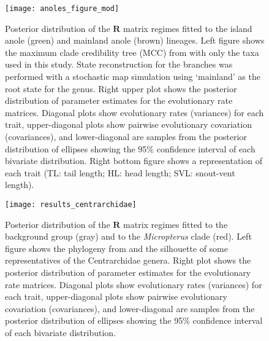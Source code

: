 \begin{figure}[h]
	\centering
	\texttt{[image: anoles\_figure\_mod]}
	\caption[Posterior distribution of the $\mathbf{R}$ matrix regimes fitted to the island anole and mainland anole lineages.]{Posterior distribution of the $\mathbf{R}$ matrix regimes fitted to the island anole (green) and mainland anole (brown) lineages. Left figure shows the maximum clade credibility tree (MCC) from \citet{gamble_anolis_2014} with only the taxa used in this study. State reconstruction for the branches was performed with a stochastic map simulation using `mainland' as the root state for the genus. Right upper plot shows the posterior distribution of parameter estimates for the evolutionary rate matrices. Diagonal plots show evolutionary rates (variances) for each trait, upper-diagonal plots show pairwise evolutionary covariation (covariances), and lower-diagonal are samples from the posterior distribution of ellipses showing the 95\% confidence interval of each bivariate distribution. Right bottom figure shows a representation of each trait (TL: tail length; HL: head length; SVL: snout-vent length).}
	\label{fig:anoles}
\end{figure}

\begin{figure}[h]
	\centering
	\texttt{[image: results\_centrarchidae]}
	\caption[Posterior distribution of the $\mathbf{R}$ matrix regimes fitted to the background group and to the \textit{Micropterus} clade.]{Posterior distribution of the $\mathbf{R}$ matrix regimes fitted to the background group (gray) and to the \textit{Micropterus} clade (red). Left figure shows the phylogeny from \citep{revell_phylogenetic_2009} and the silhouette of some representatives of the Centrarchidae genera. Right plot shows the posterior distribution of parameter estimates for the evolutionary rate matrices. Diagonal plots show evolutionary rates (variances) for each trait, upper-diagonal plots show pairwise evolutionary covariation (covariances), and lower-diagonal are samples from the posterior distribution of ellipses showing the 95\% confidence interval of each bivariate distribution.}
	\label{fig:centrarchidae}
\end{figure}


